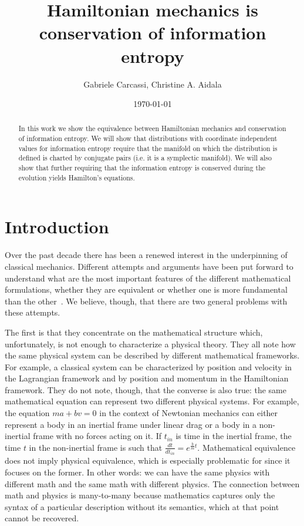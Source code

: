 \documentclass[11pt]{article}
\begin{document}
\title{Hamiltonian mechanics is conservation of information entropy}
\author{Gabriele Carcassi, Christine A. Aidala}



\date{\today}

\maketitle

\begin{abstract}
	In this work we show the equivalence between Hamiltonian mechanics and conservation of information entropy. We will show that distributions with coordinate independent values for information entropy require that the manifold on which the distribution is defined is charted by conjugate pairs (i.e. it is a symplectic manifold). We will also show that further requiring that the information entropy is conserved during the evolution yields Hamilton's equations.
\end{abstract}

\tableofcontents
\newpage

\section{Introduction}

Over the past decade there has been a renewed interest in the underpinning of classical mechanics. Different attempts and arguments have been put forward to understand what are the most important features of the different mathematical formulations, whether they are equivalent or whether one is more fundamental than the other~\cite{North,Curiel,Barrett1,Barrett2}. We believe, though, that there are two general problems with these attempts.

The first is that they concentrate on the mathematical structure which, unfortunately, is not enough to characterize a physical theory. They all note how the same physical system can be described by different mathematical frameworks. For example, a classical system can be characterized by position and velocity in the Lagrangian framework and by position and momentum in the Hamiltonian framework. They do not note, though, that the converse is also true: the same mathematical equation can represent two different physical systems. For example, the equation $ma + bv = 0$ in the context of Newtonian mechanics can either represent a body in an inertial frame under linear drag or a body in a non-inertial frame with no forces acting on it. If $t_{in}$ is time in the inertial frame, the time $t$ in the non-inertial frame is such that  $\frac{dt}{dt_{in}} = e^{\frac{b}{m}t}$. Mathematical equivalence does not imply physical equivalence, which is especially problematic for \cite{Barrett2} since it focuses on the former. In other words: we can have the same physics with different math and the same math with different physics. The connection between math and physics is many-to-many because mathematics captures only the syntax of a particular description without its semantics, which at that point cannot be recovered.
\end{document}
